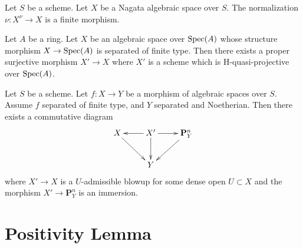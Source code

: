 \begin{lemma}
\label{lemma-nagata-normalization}
Let $S$ be a scheme. Let $X$ be a Nagata algebraic space over $S$.
The normalization $\nu : X^\nu \to X$ is a finite morphism.
\end{lemma}

\begin{lemma}
\label{lemma-weak-chow}
Let $A$ be a ring. Let $X$ be an algebraic space over $\mathop{\rm Spec}(A)$
whose structure morphism $X \to \mathop{\rm Spec}(A)$ is separated of finite type.
Then there exists a proper surjective morphism $X' \to X$
where $X'$ is a scheme which is H-quasi-projective over $\mathop{\rm Spec}(A)$.
\end{lemma}

\begin{lemma}
\label{lemma-chow-noetherian-separated}
\begin{reference}
\cite[IV Theorem 3.1]{Kn}
\end{reference}
Let $S$ be a scheme. Let $f : X \to Y$ be a morphism of algebraic spaces
over $S$. Assume $f$ separated of finite type, and $Y$ separated and
Noetherian. Then there exists a commutative diagram
$$
\xymatrix{
X \ar[rd] & X' \ar[l] \ar[d] \ar[r] & \mathbf{P}^n_Y \ar[ld] \\
& Y
}
$$
where $X' \to X$ is a $U$-admissible blowup for some dense open
$U \subset X$ and the morphism $X' \to \mathbf{P}^n_Y$ is an immersion.
\end{lemma}

\section{Positivity Lemma}

